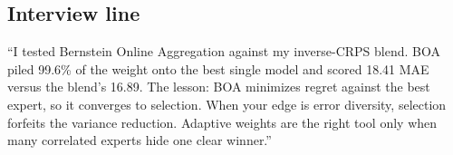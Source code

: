\subsection{Interview line}

``I tested Bernstein Online Aggregation against my inverse-CRPS
blend. BOA piled 99.6\% of the weight onto the best single model
and scored 18.41 MAE versus the blend's 16.89. The lesson: BOA
minimizes regret against the best expert, so it converges to
selection. When your edge is error diversity, selection forfeits
the variance reduction. Adaptive weights are the right tool only
when many correlated experts hide one clear winner.''

